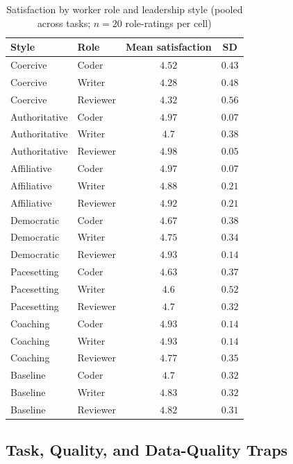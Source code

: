\begin{table}[htbp]
  \centering
  \small
  \caption{Satisfaction by worker role and leadership style (pooled across tasks; $n=20$ role-ratings per cell)}
  \label{tab:03-satisfaction-by-role}
\begin{tabular}{l l c c}
    \toprule
    Style & Role & Mean satisfaction & SD \\
    \midrule
    Coercive & Coder & $4.52$ & $0.43$ \\
    Coercive & Writer & $4.28$ & $0.48$ \\
    Coercive & Reviewer & $4.32$ & $0.56$ \\
    Authoritative & Coder & $4.97$ & $0.07$ \\
    Authoritative & Writer & $4.7$ & $0.38$ \\
    Authoritative & Reviewer & $4.98$ & $0.05$ \\
    Affiliative & Coder & $4.97$ & $0.07$ \\
    Affiliative & Writer & $4.88$ & $0.21$ \\
    Affiliative & Reviewer & $4.92$ & $0.21$ \\
    Democratic & Coder & $4.67$ & $0.38$ \\
    Democratic & Writer & $4.75$ & $0.34$ \\
    Democratic & Reviewer & $4.93$ & $0.14$ \\
    Pacesetting & Coder & $4.63$ & $0.37$ \\
    Pacesetting & Writer & $4.6$ & $0.52$ \\
    Pacesetting & Reviewer & $4.7$ & $0.32$ \\
    Coaching & Coder & $4.93$ & $0.14$ \\
    Coaching & Writer & $4.93$ & $0.14$ \\
    Coaching & Reviewer & $4.77$ & $0.35$ \\
    Baseline & Coder & $4.7$ & $0.32$ \\
    Baseline & Writer & $4.83$ & $0.32$ \\
    Baseline & Reviewer & $4.82$ & $0.31$ \\
    \bottomrule
\end{tabular}%
\end{table}

\clearpage
\subsection{Task, Quality, and Data-Quality Traps}

